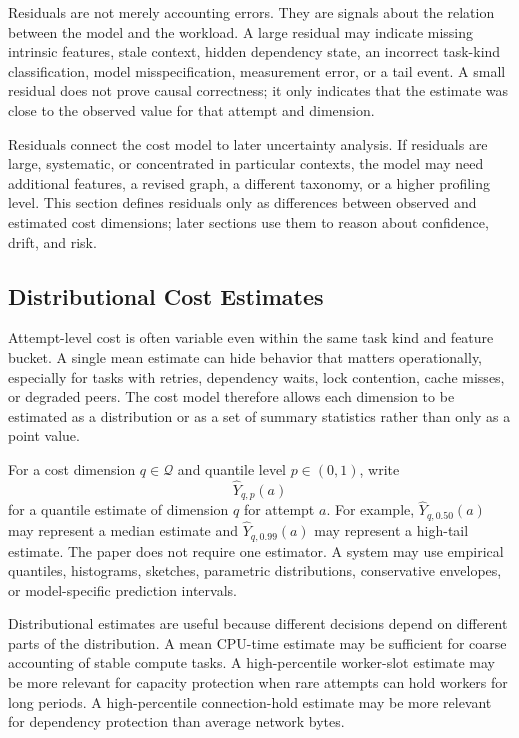 Residuals are not merely accounting errors. They are signals about the relation
between the model and the workload. A large residual may indicate missing
intrinsic features, stale context, hidden dependency state, an incorrect
task-kind classification, model misspecification, measurement error, or a tail
event. A small residual does not prove causal correctness; it only indicates
that the estimate was close to the observed value for that attempt and
dimension.

Residuals connect the cost model to later uncertainty analysis. If residuals are
large, systematic, or concentrated in particular contexts, the model may need
additional features, a revised graph, a different taxonomy, or a higher
profiling level. This section defines residuals only as differences between
observed and estimated cost dimensions; later sections use them to reason about
confidence, drift, and risk.

\subsection{Distributional Cost Estimates}
\label{sec:cost-distributional-estimates}

Attempt-level cost is often variable even within the same task kind and feature
bucket. A single mean estimate can hide behavior that matters operationally,
especially for tasks with retries, dependency waits, lock contention, cache
misses, or degraded peers. The cost model therefore allows each dimension to be
estimated as a distribution or as a set of summary statistics rather than only
as a point value.

For a cost dimension $q \in \mathcal{Q}$ and quantile level $p \in (0,1)$, write
\[
\widehat{Y}_{q,p}(a)
\]
for a quantile estimate of dimension $q$ for attempt $a$. For example,
$\widehat{Y}_{q,0.50}(a)$ may represent a median estimate and
$\widehat{Y}_{q,0.99}(a)$ may represent a high-tail estimate. The paper does not
require one estimator. A system may use empirical quantiles, histograms,
sketches, parametric distributions, conservative envelopes, or model-specific
prediction intervals.

Distributional estimates are useful because different decisions depend on
different parts of the distribution. A mean CPU-time estimate may be sufficient
for coarse accounting of stable compute tasks. A high-percentile worker-slot
estimate may be more relevant for capacity protection when rare attempts can
hold workers for long periods. A high-percentile connection-hold estimate may be
more relevant for dependency protection than average network bytes.

